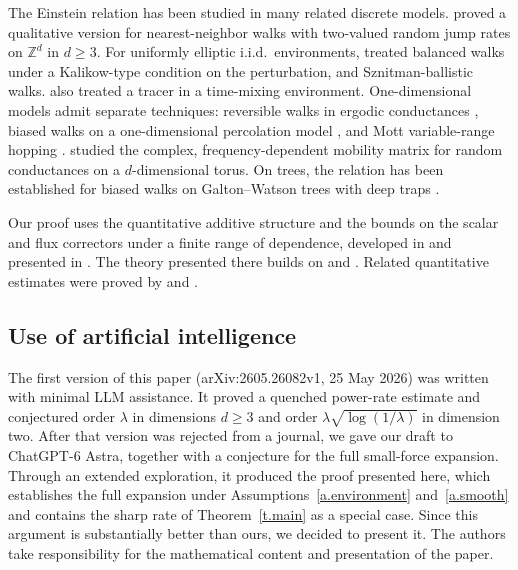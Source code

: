 \documentclass[11pt]{amsart}
\theoremstyle{definition}
\theoremstyle{remark}
\numberwithin{equation}{section}
\newcommand{\Zd}{\mathbb Z^d}
\begin{document}
The Einstein relation has been studied in many related discrete models. \citet{KomorowskiOllaRWRE2005} proved a qualitative version for nearest-neighbor walks with two-valued random jump rates on $\Zd$ in $d\geq3$. For uniformly elliptic i.i.d.\ environments, \citet{Guo2016} treated balanced walks under a Kalikow-type condition on the perturbation, and Sznitman-ballistic walks. \citet{KomorowskiOlla2005} also treated a tracer in a time-mixing environment. One-dimensional models admit separate techniques: reversible walks in ergodic conductances \citep{LamDepauw2016,FaggionatoSalvi2019}, biased walks on a one-dimensional percolation model \citep*{GantertMeinersMueller2019}, and Mott variable-range hopping \citep*{FaggionatoGantertSalvi2019}. \citet{FaggionatoSalvi2025} studied the complex, frequency-dependent mobility matrix for random conductances on a $d$-dimensional torus. On trees, the relation has been established for biased walks on Galton--Watson trees with deep traps \citep*{BenArousHuOllaZeitouni2013}.

Our proof uses the quantitative additive structure and the bounds on the scalar and flux correctors under a finite range of dependence, developed in \citet*{armstrong2017additive} and presented in \citet*{AKM2019book}. The theory presented there builds on \citet{ArmstrongSmart2016} and \citet*{armstrong2016mesoscopic}. Related quantitative estimates were proved by \citet{GloriaOtto2011,GloriaOtto2016corrector} and \citet*{gloria2020regularity}.


\subsection*{Use of artificial intelligence}
The first version of this paper (arXiv:2605.26082v1, 25 May 2026) was written with minimal LLM assistance. It proved a quenched power-rate estimate and conjectured order $\lambda$ in dimensions $d\geq3$ and order $\lambda\sqrt{\log(1/\lambda)}$ in dimension two. After that version was rejected from a journal, we gave our draft to ChatGPT-6 Astra, together with a conjecture for the full small-force expansion. Through an extended exploration, it produced the proof presented here, which establishes the full expansion under Assumptions~\ref{a.environment} and~\ref{a.smooth} and contains the sharp rate of Theorem~\ref{t.main} as a special case. Since this argument is substantially better than ours, we decided to present it. The authors take responsibility for the mathematical content and presentation of the paper.
\end{document}
